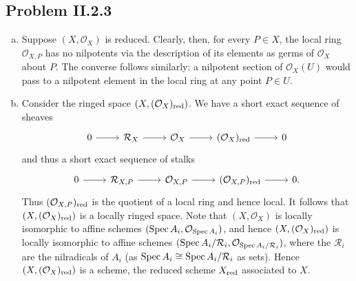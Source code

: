 \documentclass{mathnotes}
\begin{document}
\subsection*{Problem II.2.3}
\begin{enumerate}[(a)]
    \item Suppose $(X,\mathcal{O}_X)$ is reduced. Clearly, then, for every $P\in X$, the local ring $\mathcal{O}_{X,P}$
        has no nilpotents via the description of its elements as germs of $\mathcal{O}_X$ about $P$.
        The converse follows similarly: a nilpotent section of $\mathcal{O}_X(U)$ would pass to a nilpotent
        element in the local ring at any point $P\in U$.
    \item Consider the ringed space $(X,(\mathcal{O}_X)_{\rm red})$. We have a short exact sequence of sheaves
        \begin{equation*}
            \begin{tikzcd}
                0\ar{r} & \mathcal{R}_X\ar{r} & \mathcal{O}_X\ar{r} & (\mathcal{O}_X)_{\rm red}\ar{r} & 0
            \end{tikzcd}
        \end{equation*}
        and thus a short exact sequence of stalks
        \begin{equation*}
            \begin{tikzcd}
                0\ar{r} & \mathcal{R}_{X,P}\ar{r} & \mathcal{O}_{X,P}\ar{r} & (\mathcal{O}_{X,P})_{\rm red}\ar{r} & 0.
            \end{tikzcd}
        \end{equation*}
        Thus $(\mathcal{O}_{X,P})_{\rm red}$ is the quotient of a local ring and hence local. It follows that
        $(X,(\mathcal{O}_X)_{\rm red})$ is a locally ringed space. Note that $(X,\mathcal{O}_X)$ is locally
        isomorphic to affine schemes $(\operatorname{Spec} A_i,\mathcal{O}_{\operatorname{Spec} A_i})$, and hence $(X,(\mathcal{O}_X)_{\rm red})$
        is locally isomorphic to affine schemes $(\operatorname{Spec} A_i/\mathcal{R}_i,\mathcal{O}_{\operatorname{Spec} A_i/\mathcal{R}_i})$, where
        the $\mathcal{R}_i$ are the nilradicals of $A_i$ (as $\operatorname{Spec} A_i\cong \operatorname{Spec} A_i/\mathcal{R}_i$ as sets).
        Hence $(X,(\mathcal{O}_X)_{\rm red})$ is a scheme, the reduced scheme $X_{\rm red}$ associated to $X$.
        

\end{enumerate}
\end{document}
